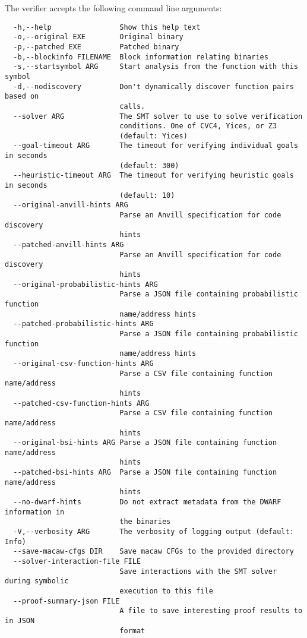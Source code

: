 The verifier accepts the following command line arguments:
\begin{verbatim}
  -h,--help                Show this help text
  -o,--original EXE        Original binary
  -p,--patched EXE         Patched binary
  -b,--blockinfo FILENAME  Block information relating binaries
  -s,--startsymbol ARG     Start analysis from the function with this symbol
  -d,--nodiscovery         Don't dynamically discover function pairs based on
                           calls.
  --solver ARG             The SMT solver to use to solve verification
                           conditions. One of CVC4, Yices, or Z3
                           (default: Yices)
  --goal-timeout ARG       The timeout for verifying individual goals in seconds
                           (default: 300)
  --heuristic-timeout ARG  The timeout for verifying heuristic goals in seconds
                           (default: 10)
  --original-anvill-hints ARG
                           Parse an Anvill specification for code discovery
                           hints
  --patched-anvill-hints ARG
                           Parse an Anvill specification for code discovery
                           hints
  --original-probabilistic-hints ARG
                           Parse a JSON file containing probabilistic function
                           name/address hints
  --patched-probabilistic-hints ARG
                           Parse a JSON file containing probabilistic function
                           name/address hints
  --original-csv-function-hints ARG
                           Parse a CSV file containing function name/address
                           hints
  --patched-csv-function-hints ARG
                           Parse a CSV file containing function name/address
                           hints
  --original-bsi-hints ARG Parse a JSON file containing function name/address
                           hints
  --patched-bsi-hints ARG  Parse a JSON file containing function name/address
                           hints
  --no-dwarf-hints         Do not extract metadata from the DWARF information in
                           the binaries
  -V,--verbosity ARG       The verbosity of logging output (default: Info)
  --save-macaw-cfgs DIR    Save macaw CFGs to the provided directory
  --solver-interaction-file FILE
                           Save interactions with the SMT solver during symbolic
                           execution to this file
  --proof-summary-json FILE
                           A file to save interesting proof results to in JSON
                           format

\end{verbatim}

